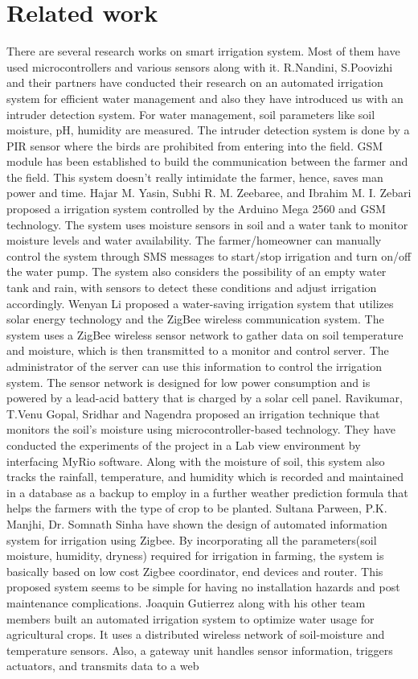 \documentclass[conference]{IEEEtran}
\begin{document}
	\section{Related work}
	There are several research works on smart irrigation system. Most of them have used microcontrollers and various sensors along with it. R.Nandini, S.Poovizhi and their partners have conducted their research on an automated irrigation system for efficient water management and also they have introduced us with an intruder detection system. For water management, soil parameters like soil moisture, pH, humidity are measured. The intruder detection system is done by a PIR sensor where the birds are prohibited from entering into the field. GSM module has been established to build the communication between the farmer and the field. This system doesn’t really intimidate the farmer, hence, saves man power and time\cite{c1}. Hajar M. Yasin, Subhi R. M. Zeebaree, and Ibrahim M. I. Zebari proposed a irrigation system controlled by the Arduino Mega 2560 and GSM technology. The system uses moisture sensors in soil and a water tank to monitor moisture levels and water availability. The farmer/homeowner can manually control the system through SMS messages to start/stop irrigation and turn on/off the water pump. The system also considers the possibility of an empty water tank and rain, with sensors to detect these conditions and adjust irrigation accordingly\cite{c2}. Wenyan Li proposed a water-saving irrigation system that utilizes solar energy technology and the ZigBee wireless communication system. The system uses a ZigBee wireless sensor network to gather data on soil temperature and moisture, which is then transmitted to a monitor and control server. The administrator of the server can use this information to control the irrigation system. The sensor network is designed for low power consumption and is powered by a lead-acid battery that is charged by a solar cell panel\cite{c3}. Ravikumar, T.Venu Gopal, Sridhar and Nagendra proposed an irrigation technique that monitors the soil’s moisture using microcontroller-based technology. They have conducted the experiments of the project in a Lab view environment by interfacing MyRio software. Along with the moisture of soil, this system also tracks the rainfall, temperature, and humidity which is recorded and maintained in a database as a backup to employ in a further weather prediction formula that helps the farmers with the type of crop to be planted\cite{c4}. Sultana Parween, P.K. Manjhi, Dr. Somnath Sinha have shown the design of automated information system for irrigation using Zigbee. By incorporating all the parameters(soil moisture, humidity, dryness) required for irrigation in farming, the system is basically based on low cost Zigbee coordinator, end devices and router. This proposed system seems to be simple for having no installation hazards and post maintenance complications\cite{c5}. Joaquin Gutierrez along with his other team members built an automated irrigation system to optimize water usage for agricultural crops. It uses a distributed wireless network of soil-moisture and temperature sensors. Also, a gateway unit handles sensor information, triggers actuators, and transmits data to a web 
\end{document}

